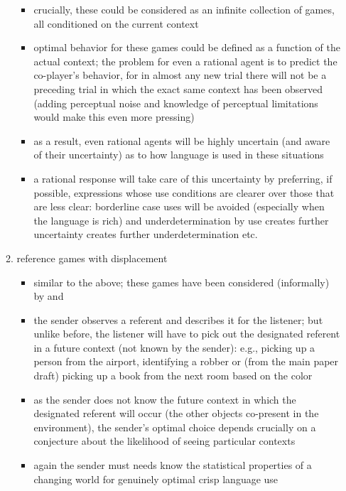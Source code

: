 \documentclass[fleqn,reqno,10pt]{article}
\begin{document}
\begin{itemize}
\begin{enumerate}
\begin{itemize}
    \item crucially, these could be considered as an infinite collection of games, all
      conditioned on the current context
    \item optimal behavior for these games could be defined as a function of the actual
      context; the problem for even a rational agent is to predict the co-player's behavior,
      for in almost any new trial there will not be a preceding trial in which the exact same
      context has been observed (adding perceptual noise and knowledge of perceptual
      limitations would make this even more pressing)
    \item as a result, even rational agents will be highly uncertain (and aware of their
      uncertainty) as to how language is used in these situations
    \item a rational response will take care of this uncertainty by preferring, if possible,
      expressions whose use conditions are clearer over those that are less clear: borderline
      case uses will be avoided (especially when the language is rich) and underdetermination
      by use creates further uncertainty creates further underdetermination etc.
    \end{itemize}
  \item reference games with displacement
    \begin{itemize}
    \item similar to the above; these games have been considered (informally) by
      \citet{Lipman2009:Why-is-Language} and \citet{Deemter2009:Utility-and-Lan}
    \item the sender observes a referent and describes it for the listener; but unlike before,
      the listener will have to pick out the designated referent in a future context (not known
      by the sender): e.g., picking up a person from the airport, identifying a robber or (from
      the main paper draft) picking up a book from the next room based on the color
    \item as the sender does not know the future context in which the designated referent will
      occur (the other objects co-present in the environment), the sender's optimal choice
      depends crucially on a conjecture about the likelihood of seeing particular contexts
    \item again the sender must needs know the statistical properties of a changing world for
      genuinely optimal crisp language use
    \end{itemize}
  \end{enumerate}
\end{itemize}
\end{document}
